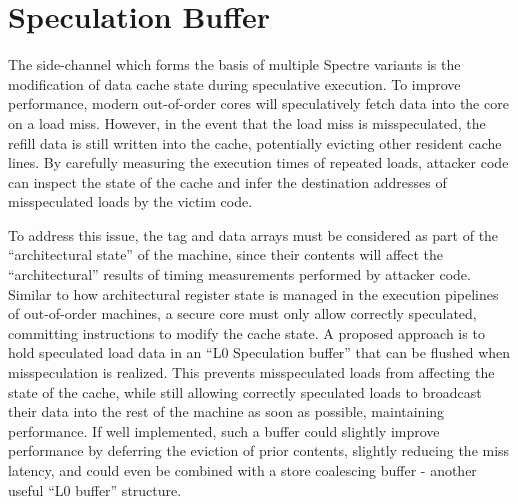 \section{Speculation Buffer}
The side-channel which forms the basis of multiple Spectre variants is the modification of data cache state during speculative execution.
To improve performance, modern out-of-order cores will speculatively fetch data into the core on a load miss.
However, in the event that the load miss is misspeculated, the refill data is still written into the cache, potentially evicting other resident cache lines.
By carefully measuring the execution times of repeated loads, attacker code can inspect the state of the cache and infer the destination addresses of misspeculated loads by the victim code.

To address this issue, the tag and data arrays must be considered as part of the ``architectural state'' of the machine, since their contents will affect the ``architectural'' results of timing measurements performed by attacker code.
Similar to how architectural register state is managed in the execution pipelines of out-of-order machines, a secure core must only allow correctly speculated, committing instructions to modify the cache state.
A proposed approach is to hold speculated load data in an ``L0 Speculation buffer'' that can be flushed when misspeculation is realized.
This prevents misspeculated loads from affecting the state of the cache, while still allowing correctly speculated loads to broadcast their data into the rest of the machine as soon as possible, maintaining performance. If well implemented, such a buffer could slightly improve performance by deferring the eviction of prior contents, slightly reducing the miss latency, and could even be combined with a store coalescing buffer - another useful ``L0 buffer'' structure.

